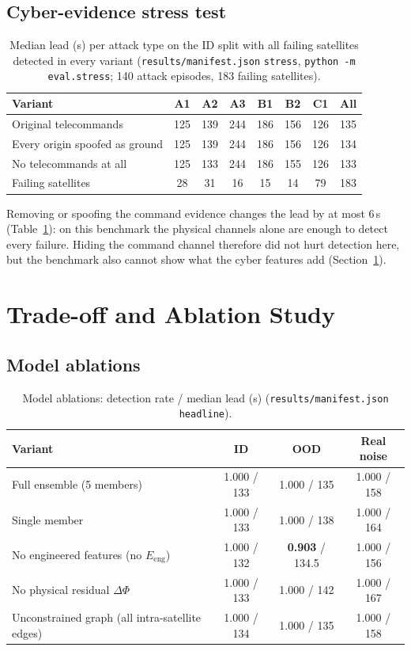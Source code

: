 \documentclass[10pt,a4paper]{article}
\newcommand{\file}[1]{\texttt{#1}}
\begin{document}
\subsection{Cyber-evidence stress test}
\begin{table}[ht]
\centering
\caption{Median lead (s) per attack type on the ID split with all failing satellites detected in every
variant (\file{results/manifest.json} \texttt{stress}, \texttt{python -m eval.stress}; 140 attack
episodes, 183 failing satellites).}
\label{tab:stress}
\small
\begin{tabular}{@{}lccccccc@{}}
\toprule
Variant & A1 & A2 & A3 & B1 & B2 & C1 & All \\
\midrule
Original telecommands & 125 & 139 & 244 & 186 & 156 & 126 & 135 \\
Every origin spoofed as ground & 125 & 139 & 244 & 186 & 156 & 126 & 134 \\
No telecommands at all & 125 & 133 & 244 & 186 & 155 & 126 & 133 \\
\midrule
Failing satellites & 28 & 31 & 16 & 15 & 14 & 79 & 183 \\
\bottomrule
\end{tabular}
\end{table}

Removing or spoofing the command evidence changes the lead by at most 6\,s (Table~\ref{tab:stress}):
on this benchmark the physical channels alone are enough to detect every failure. Hiding the command
channel therefore did not hurt detection here, but the benchmark also cannot show what the cyber
features add (Section~\ref{sec:ablation}).

\section{Trade-off and Ablation Study}
\label{sec:ablation}

\subsection{Model ablations}
\begin{table}[ht]
\centering
\caption{Model ablations: detection rate / median lead (s) (\file{results/manifest.json}
\texttt{headline}).}
\label{tab:ablation}
\small
\begin{tabular}{@{}lccc@{}}
\toprule
Variant & ID & OOD & Real noise \\
\midrule
Full ensemble (5 members) & 1.000 / 133 & 1.000 / 135 & 1.000 / 158 \\
Single member & 1.000 / 133 & 1.000 / 138 & 1.000 / 164 \\
No engineered features (no $E_{\mathrm{eng}}$) & 1.000 / 132 & \textbf{0.903} / 134.5 & 1.000 / 156 \\
No physical residual $\Delta\Phi$ & 1.000 / 133 & 1.000 / 142 & 1.000 / 167 \\
Unconstrained graph (all intra-satellite edges) & 1.000 / 134 & 1.000 / 135 & 1.000 / 158 \\
\bottomrule
\end{tabular}
\end{table}
\end{document}
